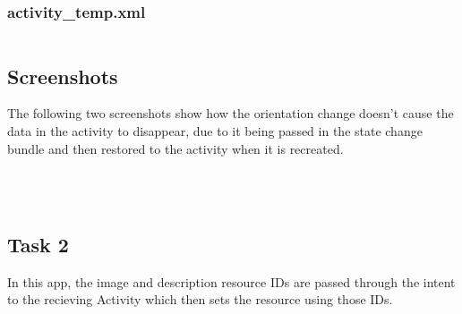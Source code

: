 \documentclass[11pt,english,numbers=endperiod,parskip=half]{scrartcl}
\begin{document}
\subsubsection{activity\_temp.xml}
\inputminted{xml}{../../Apps/Converters/app/src/main/res/layout/activity_temp.xml}

\subsection{Screenshots}
The following two screenshots show how the orientation change doesn't cause the data in the activity to disappear, due to it being passed in the state change bundle and then restored to the activity when it is recreated.

\setlength\fboxsep{0pt}
\setlength\fboxrule{0.5pt}
\\
\bigskip
{}\\

\subsection{Task 2}
In this app, the image and description resource IDs are passed through the intent to the recieving Activity which then sets the resource using those IDs.
\end{document}
